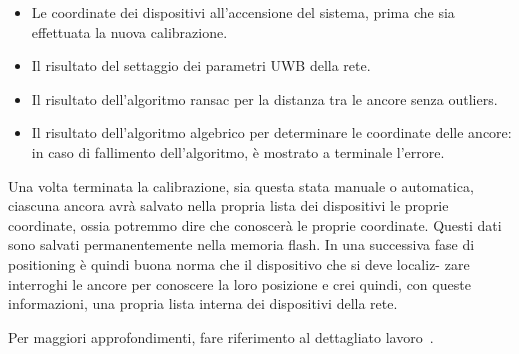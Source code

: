 \begin{itemize}
	\item Le coordinate dei dispositivi all’accensione del sistema, prima che sia effettuata la nuova calibrazione.
	
	\item Il risultato del settaggio dei parametri UWB della rete.
	
	\item Il risultato dell’algoritmo ransac per la distanza tra le ancore senza outliers.
	
	\item Il risultato dell'algoritmo algebrico per determinare le coordinate delle ancore: in caso di fallimento dell'algoritmo, è mostrato a terminale l'errore.
\end{itemize}

Una volta terminata la calibrazione, sia questa stata manuale o automatica, ciascuna ancora avrà
salvato nella propria lista dei dispositivi le proprie coordinate, ossia potremmo dire che conoscerà le proprie coordinate. 
Questi dati sono salvati permanentemente nella memoria flash.
In una successiva fase di positioning è quindi buona norma che il dispositivo che si deve localiz-
zare interroghi le ancore per conoscere la loro posizione e crei quindi, con queste informazioni, una propria lista interna dei
dispositivi della rete.


Per maggiori approfondimenti, fare riferimento al dettagliato lavoro~\cite{ctesconistudio}.

\newpage



